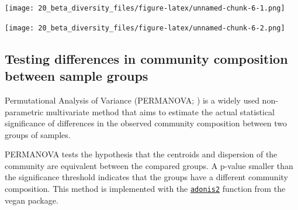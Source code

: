 \documentclass[
]{book}
\newenvironment{Shaded}{\begin{snugshade}}{\end{snugshade}}
\newcommand{\AttributeTok}[1]{\textcolor[rgb]{0.77,0.63,0.00}{#1}}
\newcommand{\ConstantTok}[1]{\textcolor[rgb]{0.00,0.00,0.00}{#1}}
\newcommand{\DecValTok}[1]{\textcolor[rgb]{0.00,0.00,0.81}{#1}}
\newcommand{\FunctionTok}[1]{\textcolor[rgb]{0.00,0.00,0.00}{#1}}
\newcommand{\NormalTok}[1]{#1}
\newcommand{\SpecialCharTok}[1]{\textcolor[rgb]{0.00,0.00,0.00}{#1}}
\newcommand{\StringTok}[1]{\textcolor[rgb]{0.31,0.60,0.02}{#1}}
\begin{document}
\texttt{[image: 20\_beta\_diversity\_files/figure-latex/unnamed-chunk-6-1.png]}

\begin{Shaded}
\end{Shaded}

\texttt{[image: 20\_beta\_diversity\_files/figure-latex/unnamed-chunk-6-2.png]}

\hypertarget{dbrda-workflow}{%
\subsection{Testing differences in community composition between sample groups}\label{dbrda-workflow}}

Permutational Analysis of Variance (PERMANOVA; \citeyearpar{Anderson2001}) is
a widely used non-parametric multivariate method that aims to
estimate the actual statistical significance of differences in the
observed community composition between two groups of samples.

PERMANOVA tests the hypothesis that the centroids and dispersion
of the community are equivalent between the compared groups. A p-value
smaller than the significance threshold indicates that the groups have a
different community composition. This method is implemented with the
\href{https://www.rdocumentation.org/packages/vegan/versions/2.4-2/topics/adonis}{\texttt{adonis2}}
function from the vegan package.
\end{document}
